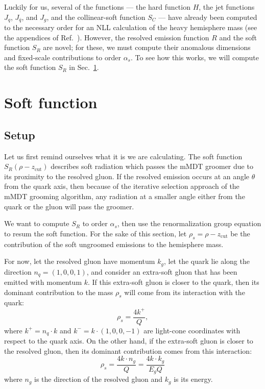 \documentclass[../thesis.tex]{subfiles}
\providecommand{\zcut}{z_\mathrm{{cut}}}
\begin{document}
	Luckily for us, several of the functions --- the hard function $H$, the jet functions $J_q$, $J_{\bar q}$, and $J_g$, and the collinear-soft function $S_C$ --- have already been computed to the necessary order for an NLL calculation of the heavy hemisphere mass (see the appendices of Ref.~\cite{frye_factorization_2016}). However, the resolved emission function $R$ and the soft function $S_R$ are novel; for these, we must compute their anomalous dimensions and fixed-scale contributions to order $\alpha_s$. To see how this works, we will compute the soft function $S_R$ in Sec.~\ref{all-sec:soft function calculation}.
	

\section{Soft function}\label{all-sec:soft function calculation}
\subsection{Setup}
	Let us first remind ourselves what it is we are calculating. The soft function $S_R(\rho - \zcut)$ describes soft radiation which passes the mMDT groomer due to its proximity to the resolved gluon. If the resolved emission occurs at an angle $\theta$ from the quark axis, then because of the iterative selection approach of the mMDT grooming algorithm, any radiation at a smaller angle either from the quark or the gluon will pass the groomer.

	We want to compute $S_R$ to order $\alpha_s$, then use the renormalization group equation to resum the soft function. For the sake of this section, let $\rho_s = \rho - \zcut$ be the contribution of the soft ungroomed emissions to the hemisphere mass.

	For now, let the resolved gluon have momentum $k_g$, let the quark lie along the direction $n_q = (1, 0, 0, 1)$, and consider an extra-soft gluon that has been emitted with momentum $k$. If this extra-soft gluon is closer to the quark, then its dominant contribution to the mass $\rho_s$ will come from its interaction with the quark:
	\begin{equation}
		\rho_s = \frac{4k^+}{Q},
	\end{equation}
	where $k^+ = n_q \cdot k$ and $k^- = k \cdot (1, 0, 0, -1)$ are light-cone coordinates with respect to the quark axis. On the other hand, if the extra-soft gluon is closer to the resolved gluon, then its dominant contribution comes from this interaction:
	\begin{equation}
		\rho_s = \frac{4 k \cdot n_g}{Q} = \frac{4 k \cdot k_g}{E_g Q}
	\end{equation}
	where $n_g$ is the direction of the resolved gluon and $k_g$ is its energy.
\end{document}

